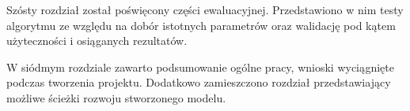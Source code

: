 Szósty rozdział został poświęcony części ewaluacyjnej. Przedstawiono w nim testy algorytmu ze względu na dobór istotnych parametrów oraz walidację pod kątem użyteczności i osiąganych rezultatów. %

W siódmym rozdziale zawarto podsumowanie ogólne pracy, wnioski wyciągnięte podczas tworzenia projektu. Dodatkowo zamieszczono rozdział przedstawiający możliwe ścieżki rozwoju stworzonego modelu.














